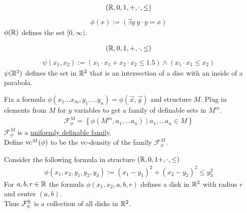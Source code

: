 \documentclass{beamer}
\newcommand{\F}{\mathcal F}
\newcommand{\curly}[1]{\left\{ #1 \right\}}
\newcommand{\paren}[1]{\left( #1 \right)}
\newcommand{\defn}{\underline}
\begin{document}
\begin{frame}
	\begin{align*}
		(\mathbb{R}, 0, 1, +, \cdot, \leq)
	\end{align*}
	\begin{align*}
		\phi(x) := \paren{\exists y \ y \cdot y = x}
	\end{align*}
	$\phi(\mathbb{R})$ defines the set $[0, \infty)$.
\end{frame}

\begin{frame}
	\begin{align*}
		(\mathbb{R}, 0, 1, +, \cdot, \leq)
	\end{align*}
	\begin{align*}
		\psi(x_1, x_2) := (x_1 \cdot x_1 + x_2 \cdot x_2 \leq 1.5) \wedge (x_1\cdot x_1 \leq x_2)
	\end{align*}
	$\psi(\mathbb{R}^2)$ defines the set in $\mathbb{R}^2$ that is an intersection of a disc with an inside of a parabola.
\end{frame}

\begin{frame}
	\begin{Definition}
		Fix a formula $\phi(x_1 \ldots x_m, y_1, \ldots y_n) = \phi(\vec x, \vec y)$ and structure $M$.
		Plug in elements from $M$ for $y$ variables to get a family of definable sets in $M^m$.
		\begin{align*}
			\F^M_\phi = \curly{\phi(M^m, a_1, \ldots a_n) \mid a_1, \ldots a_n \in M}
		\end{align*}
		$\F^M_\phi$ is a \defn{uniformly definable family}. \\
		Define $\operatorname{vc}^M(\phi)$ to be the vc-density of the family $\F^M_\phi$.
	\end{Definition}
\end{frame}

\begin{frame}
	\begin{Example}
		Consider the following formula in structure $(\mathbb{R}, 0, 1 +, \cdot, \leq)$
		\begin{align*}
			\phi(x_1, x_2, y_1, y_2, y_3) := (x_1 - y_1)^2 + (x_2 - y_2)^2 \leq y_3^2
		\end{align*}
		For $a,b,r \in \mathbb{R}$ the formula $\phi(x_1, x_2, a, b, r)$ defines a disk in $\mathbb{R}^2$ with radius $r$ and center $(a,b)$. \\
		Thus $\F^\R_\phi$ is a collection of all disks in $\mathbb{R}^2$.
	\end{Example}
\end{frame}
\end{document}

